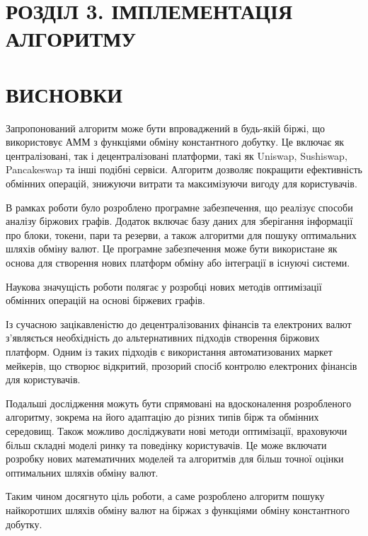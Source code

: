 \documentclass[14pt]{extarticle}
\begin{document}
\newpage

\section{РОЗДІЛ 3. ІМПЛЕМЕНТАЦІЯ АЛГОРИТМУ}\label{sec:algorithm-impl}


\newpage

\section*{ВИСНОВКИ}\label{sec:conclusions}

Запропонований алгоритм може бути впроваджений в будь-якій біржі, що
використовує АММ з функціями обміну константного добутку. Це включає як
централізовані, так і децентралізовані платформи, такі як Uniswap, Sushiswap,
Pancakeswap та інші подібні сервіси. Алгоритм дозволяє покращити ефективність
обмінних операцій, знижуючи витрати та максимізуючи вигоду для користувачів.

В рамках роботи було розроблено програмне забезпечення, що реалізує способи
аналізу біржових графів. Додаток включає базу даних для зберігання інформації про
блоки, токени, пари та резерви, а також алгоритми для пошуку оптимальних шляхів
обміну валют. Це програмне забезпечення може бути використане як основа для
створення нових платформ обміну або інтеграції в існуючі системи.

Наукова значущість роботи полягає у розробці нових методів оптимізації обмінних
операцій на основі біржевих графів.

Із сучасною зацікавленістю до децентралізованих фінансів та електроних валют
з'являється необхідність до альтернативних підходів створення біржових платформ.
Одним із таких підходів є використання автоматизованих маркет мейкерів, що
створює відкритий, прозорий спосіб контролю електроних фінансів для
користувачів.

Подальші дослідження можуть бути спрямовані на вдосконалення розробленого
алгоритму, зокрема на його адаптацію до різних типів бірж та обмінних середовищ.
Також можливо досліджувати нові методи оптимізації, враховуючи більш складні
моделі ринку та поведінку користувачів. Це може включати розробку нових
математичних моделей та алгоритмів для більш точної оцінки оптимальних шляхів
обміну валют.

Таким чином досягнуто ціль роботи, а саме розроблено алгоритм пошуку найкоротших
шляхів обміну валют на біржах з функціями обміну константного добутку.
\end{document}

